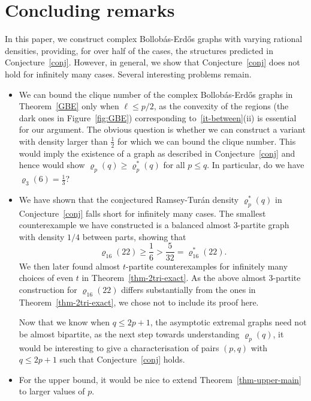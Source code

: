 \documentclass[11pt, a4paper]{article}
\theoremstyle{definition}
\begin{document}
\section{Concluding remarks}\label{sec-remarks}
In this paper, we construct complex Bollob\'as-Erd\H{o}s graphs with varying rational densities, providing, for over half of the cases, the structures predicted in Conjecture~\ref{conj}. However, in general, we show that Conjecture~\ref{conj} does not hold for infinitely many cases. Several interesting problems remain.
\begin{itemize}
	     \item We can bound the clique number of the complex Bollob\'as-Erd\H{o}s graphs in Theorem~\ref{GBE} only when $\ell\le p/2$, as the convexity of the regions (the dark ones in Figure~\ref{fig:GBE}) corresponding to~\ref{it-between}(ii) is essential for our argument. The obvious question is whether we can construct a variant with density larger than $\frac{1}{2}$ for which we can bound the clique number.
	     This would imply the existence of a graph as described in Conjecture~\ref{conj} and hence would show $\varrho_p(q) \geq \varrho_p^*(q)$ for all $p \leq q$. In particular, do we have $\varrho_3(6) = \frac{1}{3}$?
	     
	     \item We have shown that the conjectured Ramsey-Tur\'an density $\varrho_p^*(q)$ in Conjecture~\ref{conj} falls short for infinitely many cases. The smallest counterexample we have constructed is a balanced almost $3$-partite graph with density $1/4$ between parts, showing that 
	     $$\varrho_{16}(22)\ge\frac{1}{6}>\frac{5}{32}=\varrho_{16}^*(22).$$
	     We then later found almost $t$-partite counterexamples for infinitely many choices of even $t$ in Theorem~\ref{thm-2tri-exact}. As the above almost $3$-partite construction for $\varrho_{16}(22)$ differs substantially from the ones in Theorem~\ref{thm-2tri-exact}, we chose not to include its proof here.
	     
	     Now that we know when $q\le 2p+1$, the asymptotic extremal graphs need not be almost bipartite, as the next step towards understanding $\varrho_p(q)$, it would be interesting to give a characterisation of pairs $(p,q)$ with $q\le 2p+1$ such that Conjecture~\ref{conj} holds.
	     
	     \item For the upper bound, it would be nice to extend Theorem~\ref{thm-upper-main} to larger values of $p$. %
\end{itemize}
\end{document}
